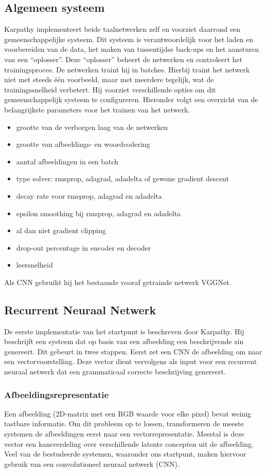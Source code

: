 \subsection{Algemeen systeem}
Karpathy implementeert beide taalnetwerken zelf en voorziet daarrond een gemeenschappelijke systeem. Dit systeem is verantwoordelijk voor het laden en voorbereiden van de data, het maken van tussentijdse back-ups en het aansturen van een ``oplosser''. Deze ``oplosser'' beheert de netwerken en controleert het trainingsproces. De netwerken traint hij in batches. Hierbij traint het netwerk niet met steeds \'e\'en voorbeeld, maar met meerdere tegelijk, wat de trainingssnelheid verbetert. 
Hij voorziet verschillende opties om dit gemeenschappelijk systeem te configureren. Hieronder volgt een overzicht van de belangrijkste parameters voor het trainen van het netwerk.
\begin{itemize}
	\item grootte van de verborgen laag van de netwerken
	\item grootte van afbeeldings- en woordcodering
	\item aantal afbeeldingen in een batch
	\item type solver: rmsprop, adagrad, adadelta of gewone gradient descent
	\item decay rate voor rmsprop, adagrad en adadelta
	\item epsilon smoothing bij rmsprop, adagrad en adadelta
	\item al dan niet gradient clipping
	\item drop-out percentage in encoder en decoder
	\item leersnelheid
\end{itemize}
Als CNN gebruikt hij het bestaande vooraf getrainde netwerk VGGNet.

\subsection{Recurrent Neuraal Netwerk}
\label{sec:rnn_methodology}
De eerste implementatie van het startpunt is beschreven door Karpathy\cite{Karpathy2015}. Hij beschrijft een systeem dat op basis van een afbeelding een beschrijvende zin genereert. Dit gebeurt in twee stappen. Eerst zet een CNN de afbeelding om naar een vectorvoorstelling. Deze vector dient vervolgens als input voor een recurrent neuraal netwerk dat een grammaticaal correcte beschrijving genereert.

\subsubsection{Afbeeldingsrepresentatie}
\label{sec:usedcnn}
Een afbeelding (2D-matrix met een RGB waarde voor elke pixel) bevat weinig tastbare informatie. Om dit probleem op te lossen, transformeren de meeste systemen de afbeeldingen eerst naar een vectorrepresentatie. Meestal is deze vector een kansverdeling over verschillende latente concepten uit de afbeelding. Veel van de bestudeerde systemen, waaronder ons startpunt, maken hiervoor gebruik van een convolutioneel neuraal netwerk (CNN).

